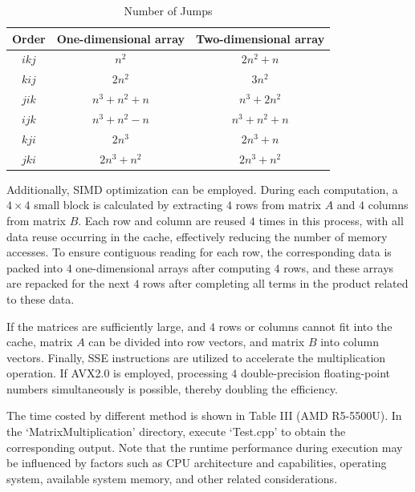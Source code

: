 \documentclass[conference]{IEEEtran}
\begin{document}
\begin{table}
	\caption{Number of Jumps}
	\begin{center}
		\begin{tabular}{c c c}
			\toprule
			Order &One-dimensional array&Two-dimensional array\\
			\hline
			 $ikj$  &    $n^2$    &    $2n^2+n$  \\  
 $kij$  &   $2n^2$      &   $3n^2$     \\
 $jik$ & $n^{3}+n^2+n$  & $n^3+2n^2$   \\
 $ijk$ &  $n^3+n^2-n$  & $n^{3}+n^2+n$ \\
 $kji$  &   $2n^3$    &    $2n^3+n$    \\
 $jki$ &  $2n^3+n^2$  &   $2n^3+n^2$   \\
			\bottomrule
		\end{tabular}
	\end{center}
\end{table}

Additionally, SIMD optimization can be employed. During each computation, a \(4 \times 4\) small block is calculated by extracting \(4\) rows from matrix \(A\) and \(4\) columns from matrix \(B\). Each row and column are reused \(4\) times in this process, with all data reuse occurring in the cache, effectively reducing the number of memory accesses. To ensure contiguous reading for each row, the corresponding data is packed into \(4\) one-dimensional arrays after computing \(4\) rows, and these arrays are repacked for the next \(4\) rows after completing all terms in the product related to these data.

If the matrices are sufficiently large, and \(4\) rows or columns cannot fit into the cache, matrix \(A\) can be divided into row vectors, and matrix \(B\) into column vectors. Finally, SSE instructions are utilized to accelerate the multiplication operation. If AVX2.0 is employed, processing \(4\) double-precision floating-point numbers simultaneously is possible, thereby doubling the efficiency.

The time costed by different method is shown in Table III (AMD R5-5500U). In the `MatrixMultiplication' directory, execute `Test.cpp' to obtain the corresponding output. Note that the runtime performance during execution may be influenced by factors such as CPU architecture and capabilities, operating system, available system memory, and other related considerations.
\end{document}
